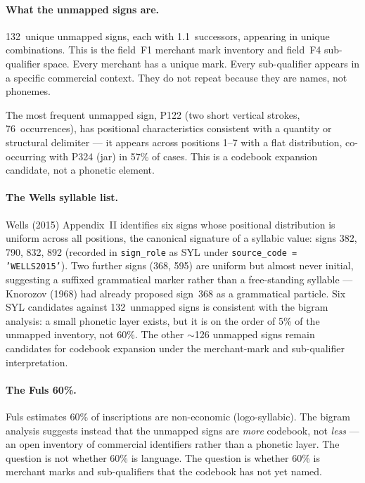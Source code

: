 \paragraph{What the unmapped signs are.}
132~unique unmapped signs, each with 1.1~successors, appearing
in unique combinations. This is the field~F1 merchant mark
inventory and field~F4 sub-qualifier space. Every merchant has a
unique mark. Every sub-qualifier appears in a specific commercial
context. They do not repeat because they are names, not phonemes.

The most frequent unmapped sign, P122 (two short vertical strokes,
76~occurrences), has positional characteristics consistent with a
quantity or structural delimiter --- it appears across positions
1--7 with a flat distribution, co-occurring with P324 (jar) in
57\% of cases. This is a codebook expansion candidate, not a
phonetic element.

\paragraph{The Wells syllable list.}
Wells (2015) Appendix~II identifies six signs whose positional
distribution is uniform across all positions, the canonical
signature of a syllabic value: signs 382, 790, 832,
892\smartcite{Wells2015} (recorded in \texttt{sign\_role} as SYL
under \texttt{source\_code = 'WELLS2015'}). Two further signs
(368, 595) are uniform but almost never initial, suggesting a
suffixed grammatical marker rather than a free-standing syllable
--- Knorozov (1968) had already proposed sign~368 as a grammatical
particle.\smartcite{Knorozov1968}
Six SYL candidates against 132~unmapped signs is consistent with
the bigram analysis: a small phonetic layer exists, but it is on
the order of 5\% of the unmapped inventory, not 60\%. The other
$\sim$126 unmapped signs remain candidates for codebook expansion
under the merchant-mark and sub-qualifier interpretation.

\paragraph{The Fuls 60\%.}
Fuls estimates 60\% of inscriptions are non-economic
(logo-syllabic). The bigram analysis suggests instead that the
unmapped signs are \emph{more} codebook, not \emph{less} --- an
open inventory of commercial identifiers rather than a phonetic
layer. The question is not whether 60\% is language. The question
is whether 60\% is merchant marks and sub-qualifiers that the
codebook has not yet named.

